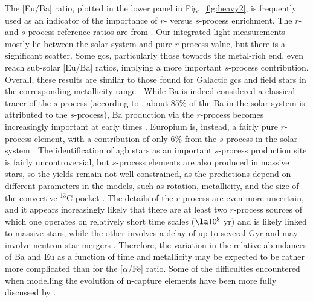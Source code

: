 \documentclass{aa}
\begin{document}
The [Eu/Ba] ratio, plotted in the lower panel in Fig.~\ref{fig:heavy2}, is frequently used as an indicator of the importance of $r$- versus $s$-process enrichment. The $r$- and $s$-process reference ratios are  from \citet{McWilliam1997}. Our integrated-light measurements mostly lie between the
solar system and pure $r$-process value, but there is a significant scatter.  Some \acp{gc}, particularly those towards the metal-rich end, even reach sub-solar [Eu/Ba] ratios, implying a more important $s$-process contribution. Overall, these results are similar to those found for Galactic \acp{gc} and field stars in the corresponding metallicity range \citep{McWilliam1997,Gratton2004}. 
While Ba is indeed considered a classical tracer of the $s$-process (according to \citet{Bisterzo2014}, 
about 85\% of the Ba in the solar system is attributed to the $s$-process), Ba production via the $r$-process becomes increasingly important at early times \citep{Pagel1997a,Cescutti2006}. 
Europium is, instead, a fairly pure $r$-process element, with a contribution of only 6\% from the $s$-process in the solar system \citep{Bisterzo2014}.  The identification of \ac{agb} stars as an important $s$-process production site is fairly uncontroversial, but $s$-process elements are also produced in massive stars, so the yields remain not well constrained, as the predictions depend on different parameters in the models, such as rotation, metallicity, and the size of the convective $^{13}$C pocket \citep{Cescutti2006,Prantzos2018, Limongi2018, Kobayashi2020}. The details of the $r$-process are even more uncertain, and it appears increasingly likely that there are at least two $r$-process sources of which one operates on relatively short time scales ($\la10^8$ yr) and is likely linked to massive stars, while the other involves a delay of up to several Gyr and may involve neutron-star mergers
\citep{Skuladottir2020,Molero2021}. Therefore, the variation in the relative abundances of Ba and Eu as a function of time and metallicity may be expected to be rather more complicated than for the [$\alpha$/Fe] ratio. Some of the difficulties encountered when modelling the evolution of n-capture elements have been more fully discussed by \citet{Tautvaisiene2021}.
\end{document}

